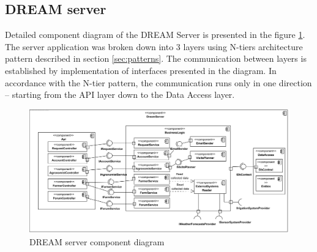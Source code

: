 \subsection{DREAM server}\label{subsec:backend-components}
Detailed component diagram of the DREAM Server is presented in the figure \ref{fig:backend-components}. The server application was broken down into 3 layers using N-tiers architecture pattern described in section \ref{sec:patterns}. The communication between layers is established by implementation of interfaces presented in the diagram. In accordance with the N-tier pattern, the communication runs only in one direction – starting from the API layer down to the Data Access layer. 

\begin{figure}[H]
    \centering
    \includegraphics[scale=0.58, origin=c]
    {diagrams/component/BackendComponents.png}
    \caption{DREAM server component diagram}
    \label{fig:backend-components}
\end{figure}

